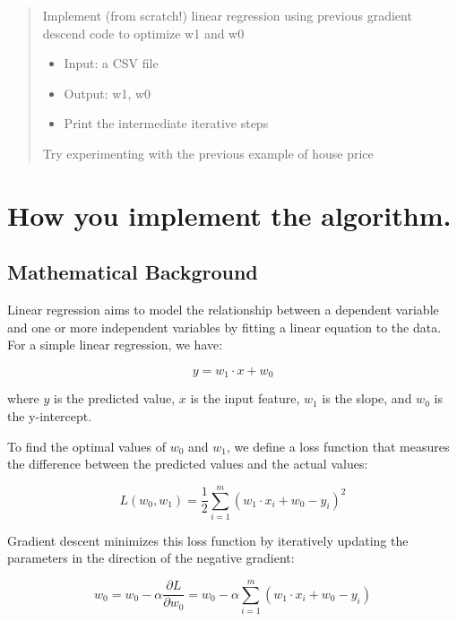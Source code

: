 \documentclass[hidelinks]{report}
\begin{document}
\begin{abstract}
        \noindent Implement (from scratch!) linear regression using previous gradient descend code to optimize w1 and w0
        \begin{itemize}
            \item Input: a CSV file
            \item Output: w1, w0
            \item Print the intermediate iterative steps
        \end{itemize}
        \noindent Try experimenting with the previous example of house price
\end{abstract}

\chapter{How you implement the algorithm.}

\section{Mathematical Background}
Linear regression aims to model the relationship between a dependent variable and one or more independent variables by fitting a linear equation to the data. For a simple linear regression, we have:

\begin{equation}
y = w_1 \cdot x + w_0
\end{equation}

\noindent where $y$ is the predicted value, $x$ is the input feature, $w_1$ is the slope, and $w_0$ is the y-intercept.

\noindent To find the optimal values of $w_0$ and $w_1$, we define a loss function that measures the difference between the predicted values and the actual values:

\begin{equation}
L(w_0, w_1) = \frac{1}{2} \sum_{i=1}^{m} (w_1 \cdot x_i + w_0 - y_i)^2
\end{equation}

\noindent Gradient descent minimizes this loss function by iteratively updating the parameters in the direction of the negative gradient:

\begin{equation}
w_0 = w_0 - \alpha \frac{\partial L}{\partial w_0} = w_0 - \alpha \sum_{i=1}^{m} (w_1 \cdot x_i + w_0 - y_i)
\end{equation}
\end{document}
